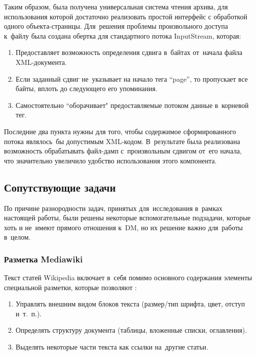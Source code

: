Таким образом, была получена универсальная система чтения архива, 
для использования которой достаточно реализовать простой интерфейс с обработкой одного объекта-страницы.
Для~решения проблемы произвольного доступа к~файлу была создана обертка для стандартного потока InputStream, которая:

\begin{enumerate}

\item{
Предоставляет возможность определения сдвига в~байтах от~начала файла XML-документа.
}

\item {
Если заданный сдвиг не~указывает на начало тега ``page'', 
то пропускает все байты, 
вплоть до следующего его упоминания.
}

\item{
Самостоятельно “оборачивает" предоставляемые потоком данные в~корневой тег.
}

\end{enumerate}

Последние два пункта нужны для того, чтобы содержимое сформированного потока являлось~бы допустимым XML-кодом.
В~результате была реализована возможность обрабатывать файл-дамп с~произвольным сдвигом от~его начала, 
что значительно увеличило удобство использования этого компонента.  

\subsection{Сопутствующие задачи}

По причине разнородности задач, принятых для~исследования в~рамках настоящей работы,
были решены некоторые вспомогательные подзадачи, которые хоть и не~имеют прямого отношения к~DM, 
но их решение важно для~работы в~целом.

\subsubsection{Разметка Mediawiki}

Текст статей Wikipedia включает в~себя помимо основного содержания элементы специальной разметки, которые позволяют \cite{wikimarkup}:

\begin{enumerate}

\item{Управлять внешним видом блоков текста (размер/тип шрифта, цвет, отступ и~т.~п.).}
\item{Определять структуру документа (таблицы, вложенные списки, оглавления).}
\item{Выделять некоторые части текста как ссылки на~другие статьи.}

\end{enumerate}

